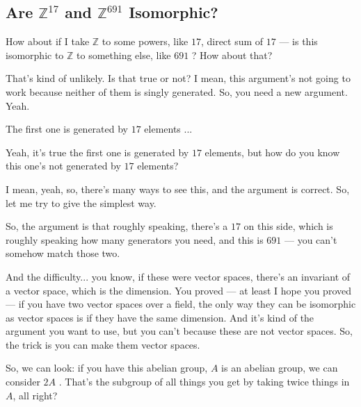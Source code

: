 \begin{hidden}
\end{hidden}

\subsection{Are \texorpdfstring{$\mathbb{Z}^{17}$}{Z\textasciicircum 17} and \texorpdfstring{$\mathbb{Z}^{691}$}{Z\textasciicircum 691} Isomorphic?}

\begin{speech}[00:36:49 - 00:37:13]
How about if I take $\mathbb{Z}$ to some powers, like $17$, direct sum of $17$ --- is this isomorphic to $\mathbb{Z}$ to something else, like $691$ ? How about that?

That's kind of unlikely. Is that true or not? I mean, this argument's not going to work because neither of them is singly generated. So, you need a new argument. Yeah.
\end{speech}

\begin{student}
The first one is generated by $17$ elements ...
\end{student}

\begin{speech}[00:37:18 - 00:38:21]
Yeah, it's true the first one is generated by $17$ elements, but how do you know this one's not generated by $17$ elements? 

I mean, yeah, so, there's many ways to see this, and the argument is correct. So, let me try to give the simplest way.

So, the argument is that roughly speaking, there's a $17$ on this side, which is roughly speaking how many generators you need, and this is $691$ --- you can't somehow match those two.

And the difficulty... you know, if these were vector spaces, there's an invariant of a vector space, which is the dimension. You proved --- at least I hope you proved --- if you have two vector spaces over a field, the only way they can be isomorphic as vector spaces is if they have the same dimension. And it's kind of the argument you want to use, but you can't because these are not vector spaces. So, the trick is you can make them vector spaces.

So, we can look: if you have this abelian group, $A$ is an abelian group, we can consider $2A$ . That's the subgroup of all things you get by taking twice things in $A$, all right?
\end{speech}

